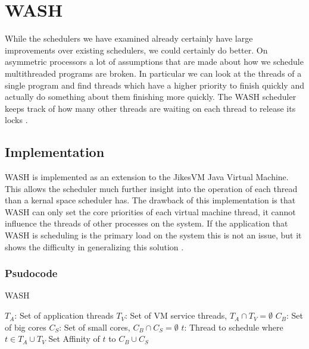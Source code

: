 \section{WASH}
While the schedulers we have examined already certainly have large improvements over existing schedulers, we could certainly do better.
On asymmetric processors a lot of assumptions that are made about how we schedule multithreaded programs are broken.
In particular we can look at the threads of a single program and find threads which have a higher priority to finish quickly and actually do something about them finishing more quickly.
The WASH scheduler keeps track of how many other threads are waiting on each thread to release its locks \cite{Jibaja:2016:PPA:2854038.2854047}.

\subsection{Implementation}
WASH is implemented as an extension to the JikesVM Java Virtual Machine.
This allows the scheduler much further insight into the operation of each thread than a kernal space scheduler has.
The drawback of this implementation is that WASH can only set the core priorities of each virtual machine thread, it cannot influence the threads of other processes on the system.
If the application that WASH is scheduling is the primary load on the system this is not an issue, but it shows the difficulty in generalizing this solution \cite{Jibaja:2016:PPA:2854038.2854047}.

\subsubsection{Psudocode}

\begin{algorithm}[H]
\caption{WASH}\label{euclid}
\begin{algorithmic}
		\State $T_A$: Set of application threads
		\State $T_V$: Set of VM service threads, $T_A \cap T_V = \emptyset$
		\State $C_B$: Set of big cores
		\State $C_S$: Set of small cores, $C_B \cap C_S = \emptyset$
		\State $t$: Thread to schedule where $t \in T_A \cup T_V$
			\EndIf
				\State Set Affinity of $t$ to $C_B \cup C_S$
			\EndIf
		\EndIf
	\EndFunction
\end{algorithmic}
\end{algorithm}
\cite{Jibaja:2016:PPA:2854038.2854047}
